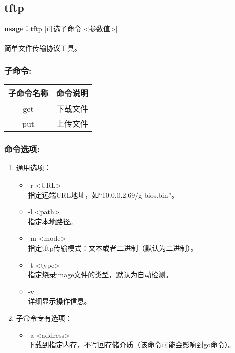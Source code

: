 \subsection{tftp}
\textbf{usage}：tftp [可选子命令 <参数值>] \\
\\ 简单文件传输协议工具。

\subsubsection{子命令:}
\begin{table}[H]
\setlength{\parindent}{0pt}
\begin{tabular}{|c|l|} \hline
子命令名称 & 命令说明 \\ \hline
get & 下载文件 \\ \hline
put & 上传文件 \\ \hline
\end{tabular}
\end{table}

\subsubsection{命令选项:}
\begin{enumerate}
	\item 通用选项：
	\begin{itemize}
		\item -r <URL> \\
		指定远端URL地址，如``10.0.0.2:69/g-bios.bin''。
		\item -l <path> \\
		指定本地路径。%
		\item -m <mode> \\
		指定tftp传输模式：文本或者二进制（默认为二进制）。
		\item -t <type> \\
		指定烧录image文件的类型，默认为自动检测。
		\item -v \\
		详细显示操作信息。
	\end{itemize}

	\item 子命令专有选项：
	\begin{itemize}
		\item -a <address> \\
		下载到指定内存，不写回存储介质（该命令可能会影响到go命令）。
	\end{itemize}
\end{enumerate}

